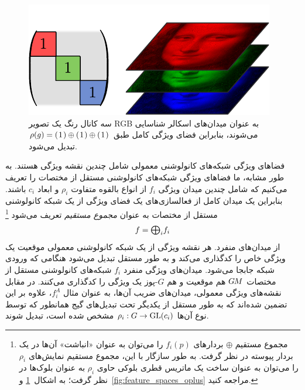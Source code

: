 				\begin{figure}
					\vspace*{-4.25ex}
					\hfill
					\includegraphics[width=.95\linewidth]{figures/feature_field_RGB.pdf}%
					\vspace*{.0ex}
					\captionsetup{width=.35\textwidth}
					\caption{\small
						سه کانال رنگ یک تصویر RGB به عنوان میدان‌های اسکالر شناسایی می‌شوند، بنابراین فضای ویژگی کامل طبق $\rho(g) = (\mkern1.5mu 1 \mkern1.5mu) \oplus (\mkern1.5mu 1 \mkern1.5mu) \oplus (\mkern1.5mu 1 \mkern1.5mu)$ تبدیل می‌شود.
					}
					\label{fig:feature_space_RGB}
				\end{figure}%
				فضاهای ویژگی شبکه‌های کانولوشنی معمولی شامل چندین نقشه ویژگی هستند.
				به طور مشابه، ما فضاهای ویژگی شبکه‌های کانولوشنی مستقل از مختصات را تعریف می‌کنیم که شامل چندین میدان ویژگی $f_i$ از انواع بالقوه متفاوت $\rho_i$ و ابعاد $c_i$ باشند.
				بنابراین یک میدان کامل از فعالسازی‌های یک فضای ویژگی از یک شبکه کانولوشنی مستقل از مختصات به عنوان \emph{مجموع مستقیم} تعریف می‌شود%
				\footnote{
					مجموع مستقیم $\oplus$ بردارهای $f_i(p)$ را می‌توان به عنوان «انباشت» آن‌ها در یک بردار پیوسته در نظر گرفت.
					به طور سازگار با این، مجموع مستقیم نمایش‌های $\rho_i$ را می‌توان به عنوان ساخت یک ماتریس قطری بلوکی حاوی $\rho_i$ به عنوان بلوک‌ها در نظر گرفت؛ به اشکال~\ref{fig:feature_space_RGB} و~\ref{fig:feature_spaces_oplus} مراجعه کنید.
				}
				\begin{align}\label{eq:feature_field_full}
					f = \scalebox{1.1}{$\bigoplus$}_i f_i
				\end{align}
				از میدان‌های منفرد.
				هر نقشه ویژگی از یک شبکه کانولوشنی معمولی موقعیت یک ویژگی خاص را کدگذاری می‌کند و به طور مستقل تبدیل می‌شود هنگامی که ورودی شبکه جابجا می‌شود.
				میدان‌های ویژگی منفرد $f_i$ شبکه‌های کانولوشنی مستقل از مختصات $G\mkern-1.4muM$ هم موقعیت و هم $G$-پوز یک ویژگی را کدگذاری می‌کنند.
				در مقابل نقشه‌های ویژگی معمولی، میدان‌های ضریب آن‌ها، به عنوان مثال $f_i^A$، علاوه بر این تضمین شده‌اند که به طور مستقل از یکدیگر تحت تبدیل‌های گیج همانطور که توسط نوع آن‌ها ${\rho_i:G\to\operatorname{GL}({c_i})}$ مشخص شده است، تبدیل شوند.
